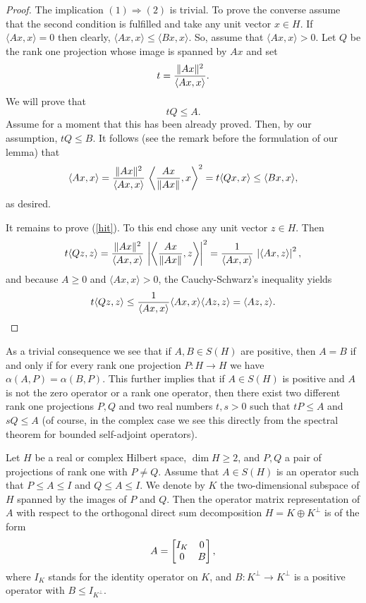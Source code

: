 \documentclass{article}
\begin{document}
\begin{proof}
The implication $(1) \Rightarrow (2)$ is trivial. To prove the converse assume that the second condition is fulfilled and take any unit vector $x \in H$. If $\langle Ax , x \rangle = 0$ then clearly,  $\langle Ax , x \rangle \le  \langle Bx , x \rangle$. So, assume that  $\langle Ax , x \rangle > 0$. Let $Q$ be the rank one projection whose image is spanned by $Ax$ and set 
$$
t = { \| Ax\|^2 \over \langle Ax , x \rangle } .
$$
We will prove that 
\begin{equation}\label{hit}
tQ \le A .
\end{equation}
Assume for a moment that this has been already proved. Then, by our assumption, $tQ \le B$. It follows (see the remark before the formulation of our lemma) that
$$
\langle Ax , x \rangle =  { \| Ax\|^2 \over \langle Ax , x \rangle } \, \left \langle {Ax \over \| Ax \|} , x \right\rangle^2 = t \langle Qx , x \rangle \le \langle Bx , x \rangle ,
$$
as desired.

It remains to prove (\ref{hit}). To this end chose any unit vector $z \in H$. Then
$$
 t \langle Qz , z \rangle =  { \| Ax\|^2 \over \langle Ax , x \rangle } \, \left| \left \langle {Ax \over \| Ax \|} , z \right\rangle \right|^2 
=  { 1 \over \langle Ax , x \rangle } \, \left| \left \langle Ax , z \right\rangle \right|^2 ,
$$
and because $A \ge 0$ and $ \langle Ax , x \rangle >0$, the Cauchy-Schwarz's inequality yields 
$$
 t \langle Qz , z \rangle \le  { 1 \over \langle Ax , x \rangle } \langle Ax , x \rangle \langle Az , z \rangle =  \langle Az , z \rangle .
$$
\end{proof}

As a trivial consequence we see that if $A,B \in S(H)$ are positive, then $A =B$ if and only if for 
 every rank one projection $P : H \to H$ we have $\alpha (A, P) = \alpha (B,P)$. This further implies that if $A \in S(H)$ is positive and $A$ is not the zero operator or a rank one operator, then there exist two different rank one projections $P,Q$ and two real numbers $t,s >0$ such that $tP \le A$ and $sQ \le A$ (of course, in the complex case we see this directly from the spectral theorem for bounded self-adjoint operators).

\begin{lemma}\label{projtwo}
Let $H$ be a real or complex Hilbert space, $\dim H \ge 2$, and $P,Q$ a pair of projections of rank one with $P\not=Q$. Assume that $A \in S(H)$ is an operator such that $P \le A \le I$ and $Q \le A \le I$. We denote by $K$ the two-dimensional subspace of $H$ spanned by the images of $P$ and $Q$. Then the operator matrix representation of $A$ with respect to the orthogonal direct sum decomposition $H = K \oplus K^\perp$ is of the form
$$
A = \left[ \begin{matrix} I_K & 0 \cr 0 & B \cr \end{matrix} \right],
$$
where $I_K$ stands for the identity operator on $K$, and $B :  K^\perp \to K^\perp$ is a positive operator with $B \le I_{K^\perp}$. 
\end{lemma}
\end{document}
